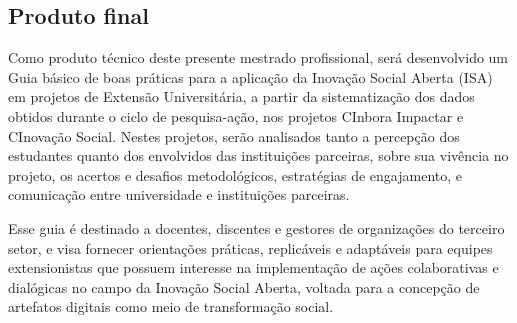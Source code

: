 \subsection{Produto final}

Como produto técnico deste presente mestrado profissional, será desenvolvido um Guia básico de boas práticas para a aplicação da Inovação Social Aberta (ISA) em projetos de Extensão Universitária, a partir da sistematização dos dados obtidos durante o ciclo de pesquisa-ação, nos projetos CInbora Impactar e CInovação Social. Nestes projetos, serão analisados tanto a percepção dos estudantes quanto dos envolvidos das instituições parceiras, sobre sua vivência no projeto, os acertos e desafios metodológicos, estratégias de engajamento, e comunicação entre universidade e instituições parceiras.

Esse guia é destinado a docentes, discentes e gestores de organizações do terceiro setor, e visa fornecer orientações práticas, replicáveis e adaptáveis para equipes extensionistas que possuem interesse na implementação de ações colaborativas e dialógicas no campo da Inovação Social Aberta, voltada para a concepção de artefatos digitais como meio de transformação social.


